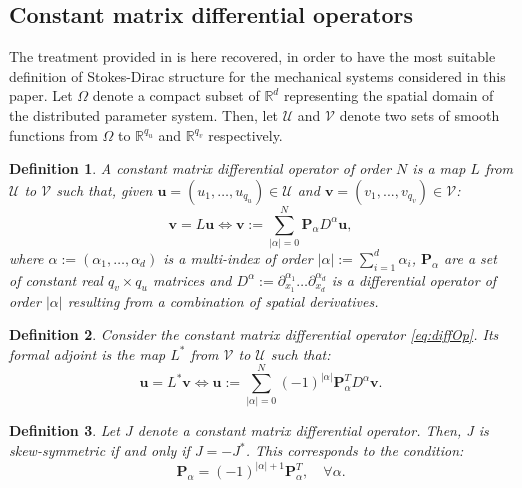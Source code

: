\documentclass[11pt]{article}
\newtheorem{definition}{Definition}
\begin{document}
{		\subsection{Constant matrix differential operators}
		The treatment provided in \cite{MacchelliModelling} is here recovered, in order to have the most suitable definition of Stokes-Dirac structure for the mechanical systems considered in this paper.
		Let $\Omega$ denote a compact subset of $\mathbb{R}^d$ representing the spatial domain of the distributed parameter system. Then, let $\mathcal{U}$ and $\mathcal{V}$ denote two sets of smooth functions from $\Omega$ to $\mathbb{R}^{q_u}$ and $\mathbb{R}^{q_v}$ respectively.
		\begin{definition}
			A constant matrix differential operator of order $N$ is a map $L$ from $\mathcal{U}$ to $\mathcal{V}$ such that, given $\bm{u} = (u_1 , \dots , u_{q_u}) \in \mathcal{U}$ and $\bm{v} = (v_1 , . . . , v_{q_v}) \in \mathcal{V}$:
			\begin{equation}
			\label{eq:diffOp}
			\bm{v} = L \bm{u} \iff \bm{v} := \sum_{|\alpha|=0}^N  \bm{P}_{\alpha} D^{\alpha} \bm{u},
			\end{equation}
			where $\alpha := (\alpha_1, \dots , \alpha_d)$ is a multi-index of order $|\alpha| := \sum_{i=1}^d \alpha_i$, $\bm{P}_\alpha$ are a set of constant real $q_v \times q_u$ matrices and $D^{\alpha} := \partial_{x_1}^{\alpha_1} \dots \partial_{x_d}^{\alpha_d}$ is a differential operator of order $|\alpha|$ resulting from a combination of spatial derivatives. 
		\end{definition}
		\begin{definition}
			Consider the constant matrix differential operator \eqref{eq:diffOp}. Its formal adjoint is the map $L^*$ from $\mathcal{V}$ to $\mathcal{U}$ such that:
			\begin{equation}
			\bm{u} = L^* \bm{v} \iff \bm{u} := \sum_{|\alpha|=0}^N  (-1)^{|\alpha|} \bm{P}_{\alpha}^T D^{\alpha} \bm{v}.
			\end{equation}
		\end{definition}
		\begin{definition}
			\label{def:skewOp}
			Let $J$ denote a constant matrix differential operator. Then, J is skew-symmetric if and only if $J = -J^*$. This corresponds to the condition:
			\begin{equation}
			\bm{P}_{\alpha} = (-1)^{|\alpha| + 1} \bm{P}_{\alpha}^T, \quad \forall \alpha.
			\end{equation}
		\end{definition}
}
\end{document}
